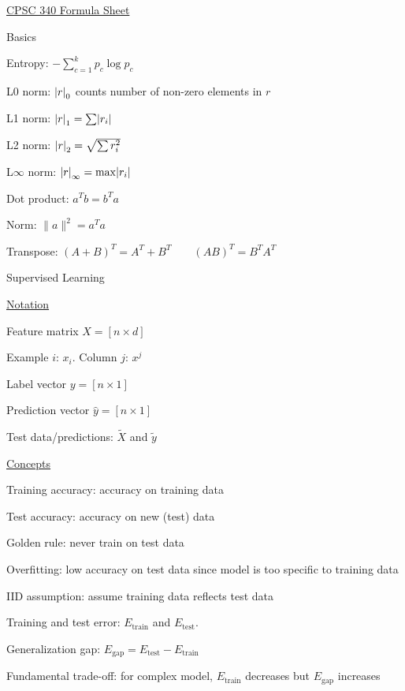 \documentclass[10pt]{article}
\makeatletter
\newcommand{\abs}[1]{\left|#1\right|}
\let\originalleft\left
\let\originalright\right
\renewcommand{\left}{\mathopen{}\mathclose\bgroup\originalleft}
\renewcommand{\right}{\aftergroup\egroup\originalright}
\renewcommand{\section}{\@startsection{section}{1}{0ex}{-1ex}{0.7ex}
                        {\normalfont\normalsize\bfseries}}
\newcommand{\train}{\text{train}}
\newcommand{\test}{\text{test}}
\newcommand{\gap}{\text{gap}}
\newcommand{\norm}[1]{\lVert #1 \rVert}
\makeatother
\begin{document}
\small

\begin{multicols*}{3}
\raggedcolumns

{\LARGE{\underline{CPSC 340 Formula Sheet}}}

\section{Basics}

Entropy: $-\sum_{c=1}^k p_c\log p_c$

L0 norm: $\abs{r}_0$ counts number of non-zero elements in $r$

L1 norm: $\abs{r}_1=\sum\abs{r_i}$

L2 norm: $\abs{r}_2=\sqrt{\sum r_i^2}$

L$\infty$ norm: $\abs{r}_\infty=\max\abs{r_i}$

Dot product: $a^Tb=b^Ta$

Norm: $\norm{a}^2=a^Ta$

Transpose: $(A+B)^T=A^T+B^T\qquad(AB)^T=B^TA^T$

\section{Supervised Learning}

\underline{Notation}

Feature matrix $X=[n \times d]$

Example $i$: $x_i$. \quad Column $j$: $x^j$

Label vector $y=[n \times 1]$

Prediction vector $\hat y=[n \times 1]$

Test data/predictions: $\widetilde{X}$ and $\tilde{y}$

\underline{Concepts}

Training accuracy: accuracy on training data

Test accuracy: accuracy on new (test) data

Golden rule: never train on test data

Overfitting: low accuracy on test data since model is too specific to training data

IID assumption: assume training data reflects test data

Training and test error: $E_\train$ and $E_\test$.

Generalization gap: $E_\gap=E_\test-E_\train$

Fundamental trade-off: for complex model, $E_\train$ decreases but $E_\gap$ increases


\end{multicols*}
\end{document}
